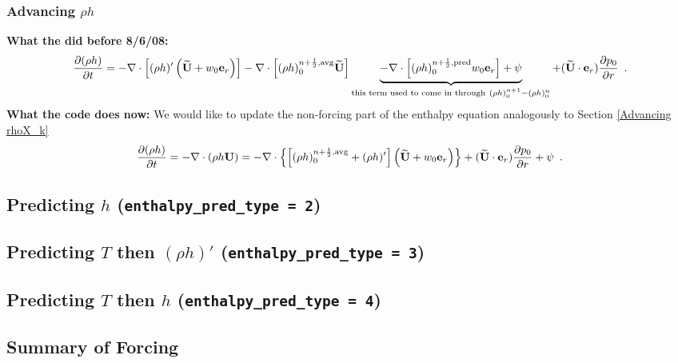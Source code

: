 \documentclass[11pt]{article}
\def\half  {\frac{1}{2}}
\def\eb    {{\bf e}}
\def\Ub    {{\bf U}}
\def\Ubt   {\widetilde{\bf U}}
\def\ut    {\widetilde{\bf U}}
\def\er    {{\bf e}_r}
\begin{document}
\subsubsection{Advancing $\rho h$}
{\bf What the did before 8/6/08:}
\begin{equation}
\frac{\partial(\rho h)}{\partial t} = -\nabla\cdot\left[(\rho h)'\left(\Ubt 
+ w_0\eb_r\right)\right] - \nabla\cdot\left[(\rho h)_0^{n+\half,{\rm avg}}\Ubt\right] 
\underbrace{- \nabla\cdot\left[(\rho h)_0^{n+\half,{\rm pred}}w_0\eb_r\right] + \psi}_{\text{this term used to come in through} ~ (\rho h)_0^{n+1} - (\rho h)_0^n} + (\ut \cdot \er)\frac{\partial p_0}{\partial r} \enskip .
\end{equation}
{\bf What the code does now:} We would like to update the 
non-forcing part of the enthalpy equation analogously to Section \ref{Advancing rhoX_k}
\begin{equation}
\frac{\partial(\rho h)}{\partial t} = -\nabla\cdot(\rho h\Ub) = 
-\nabla\cdot\left\{\left[(\rho h)_0^{n+\half,{\rm avg}} 
+ (\rho h)'\right]\left(\Ubt + w_0\eb_r\right)\right\} + (\ut \cdot \er)\frac{\partial p_0}{\partial r} + \psi  \enskip .
\end{equation}


\subsection{Predicting $h$ ({\tt enthalpy\_pred\_type = 2})}

\subsection{Predicting $T$ then $(\rho h)'$ ({\tt enthalpy\_pred\_type = 3})}

\subsection{Predicting $T$ then $h$ ({\tt enthalpy\_pred\_type = 4})}

\subsection{Summary of Forcing}
\end{document}
